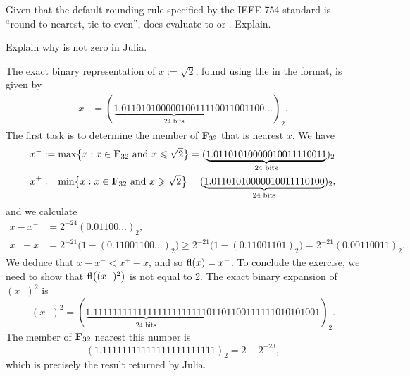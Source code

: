 \begin{exercise}
    Given that the default rounding rule specified by the IEEE 754 standard is ``round to nearest, tie to even'',
    does  evaluate to  or .
    Explain.
\end{exercise}

\begin{exercise}
    Explain why  is not zero in Julia.
\end{exercise}
\begin{solution}
    The exact binary representation of $x := \sqrt{2}$, found using the  in the  format,
    is given by
    \begin{align*}
        x
        &= (\underbrace{1.01101010000010011110011}_{\text{24 bits}}001100\dots)_2.
    \end{align*}
    The first task is to determine the member of $\mathbf F_{32}$ that is nearest $x$.
    We have
    \begin{align*}
        x^- &:= \max \bigl\{x: x \in \mathbf F_{32} \text{ and } x \leqslant \sqrt{2}\bigr\} = (\underbrace{1.01101010000010011110011}_{\text{24 bits}})_2 \\
        x^+ &:= \min \bigl\{x: x \in \mathbf F_{32} \text{ and } x \geqslant \sqrt{2}\bigr\} = (\underbrace{1.01101010000010011110100}_{\text{24 bits}})_2,
    \end{align*}
    and we calculate
    \begin{align*}
        x - x^- &= 2^{-24} (0.01100\dots)_2, \\
        x^+ - x &= 2^{-21} \bigl(1 - (0.11001100\dots)_2 \bigr)
        \geq 2^{-21} \bigl(1 - (0.11001101)_2 \bigr) =
        2^{-21} \left(0.00110011\right)_2.
    \end{align*}
    We deduce that $x - x^- < x^+ - x$,
    and so ${\rm fl}(x) = x^-$.
    To conclude the exercise,
    we need to show that ${\rm fl}\bigl((x^-)^2\bigr)$ is not equal to 2.
    The exact binary expansion of $(x^-)^2$ is
    \[
        (x^-)^2 = (\underbrace{1.11111111111111111111111}_{\text{24 bits}}01101100111111010101001)_2.
    \]
    The member of $\mathbf F_{32}$ nearest this number is
    \[
        (1.11111111111111111111111)_2 = 2 - 2^{-23},
    \]
    which is precisely the result returned by Julia.
\end{solution}

